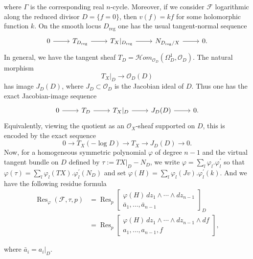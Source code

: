\documentclass[12pt,reqno,a4paper]{amsart}
\numberwithin{equation}{section}
\theoremstyle{plain}
\theoremstyle{definition}
\DeclareMathOperator{\Res}{Res}
\newcommand{\cF}{\mathcal{F}}
\begin{document}
\noindent where $\Gamma$ is the corresponding real $n$-cycle. Moreover, if we consider \(\cF\) logarithmic along the reduced divisor
\(D=\{f=0\}\), then \(v(f)=kf\) for some holomorphic function \(k\).
On the smooth locus \(D_{\mathrm{reg}}\) one has the usual tangent-normal
sequence
\[
\begin{tikzcd}
0 \arrow[r] &
T_{D_{\mathrm{reg}}} \arrow[r] &
T_X|_{D_{\mathrm{reg}}} \arrow[r] &
N_{D_{\mathrm{reg}}/X} \arrow[r] &
0 .
\end{tikzcd}
\]
In general, we  have  the tangent sheaf
$
T_D=\mathcal Hom_{\mathcal O_D}(\Omega_D^1,\mathcal O_D).
$
The natural morphism
$$
T_X|_D\longrightarrow \mathcal O_D(D)$$
has image \(J_D(D)\), where \(J_D\subset\mathcal O_D\) is the Jacobian ideal of
\(D\). Thus one has the exact Jacobian-image sequence
\[
\begin{tikzcd}
0 \arrow[r] &
T_D \arrow[r] &
T_X|_D \arrow[r] &
J_D(D) \arrow[r] &
0 .
\end{tikzcd}
\]
Equivalently, viewing the quotient as an \(\mathcal O_X\)-sheaf supported on
\(D\), this is encoded by the exact sequence
\[
0\longrightarrow T_X(-\log D)
\longrightarrow T_X
\longrightarrow J_D(D)
\longrightarrow 0.
\]
  Now, for a homogeneous symmetric polynomial $\varphi$ of degree $n-1$ and the virtual tangent bundle on $D$ defined by $\tau := TX|_{D}- N_{D}$, we write $\varphi = \sum_{l}\varphi_{l}.\varphi_{l}^{'}$ so that $\varphi(\tau) = \sum_{l}\varphi_{l}(TX).\varphi_{l}^{'}(N_{D})$ and set $\varphi(H) = \sum_{l}\varphi_{l}(Jv).\varphi_{l}^{'}(k)$. And we have the following residue formula
\begin{align*}
\Res_{\varphi}(\cF,\tau,p)
&=\Res_{p}
\left[
\begin{array}{c}
\varphi(H)\,dz_{1}\wedge \cdots \wedge dz_{n-1}  \\
{\bar{a}}_1,\ldots,\bar{a}_{n-1}
\end{array}
\right]_{D} \\[15pt]
&=\Res_{p}
\left[
\begin{array}{c}
\varphi(H)\,dz_{1}\wedge \cdots \wedge dz_{n-1}\wedge df  \\
a_1,\ldots,a_{n-1},f
\end{array}
\right],
\end{align*}

\noindent where $\bar{a}_i = a_i|_{D}.$
\end{document}
